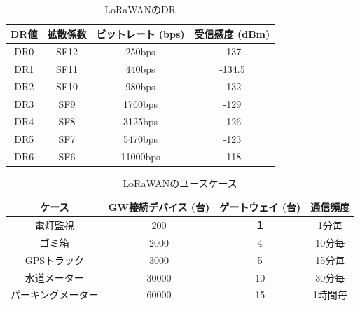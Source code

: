\begin{table}[h]
    \centering
    \caption{LoRaWANのDR}\label{fig:LoRaWAN_DR}
    \begin{tabular}{|c|c|c|c|}
    \hline
    \multicolumn{1}{|l|}{\textbf{DR値}} & \multicolumn{1}{l|}{\textbf{拡散係数}} & \multicolumn{1}{l|}{\textbf{ビットレート (bps)}} & \multicolumn{1}{l|}{\textbf{受信感度 (dBm)}} \\ \hline
    DR0                                & SF12                               & 250bps                                     & -137                                     \\ \hline
    DR1                                & SF11                               & 440bps                                     & -134.5                                   \\ \hline
    DR2                                & SF10                               & 980bps                                     & -132                                     \\ \hline
    DR3                                & SF9                                & 1760bps                                    & -129                                     \\ \hline
    DR4                                & SF8                                & 3125bps                                    & -126                                     \\ \hline
    DR5                                & SF7                                & 5470bps                                    & -123                                     \\ \hline
    DR6                                & SF6                                & 11000bps                                   & -118                                     \\ \hline
    \end{tabular}
\end{table}

\begin{table}[h]
    \centering
    \caption{LoRaWANのユースケース}\label{fig:LoRaWAN_Usecase}
    \begin{tabular}{|c|c|c|c|}
    \hline
    \textbf{ケース} & \textbf{GW接続デバイス (台)} & \textbf{ゲートウェイ (台)} & \textbf{通信頻度} \\ \hline
    電灯監視         & 200               & １                   & 1分毎           \\ \hline
    ゴミ箱          & 2000              & 4                   & 10分毎          \\ \hline
    GPSトラック      & 3000              & 5                   & 15分毎          \\ \hline
    水道メーター       & 30000             & 10                  & 30分毎          \\ \hline
    パーキングメーター    & 60000             & 15                  & 1時間毎          \\ \hline
    \end{tabular}
\end{table}

